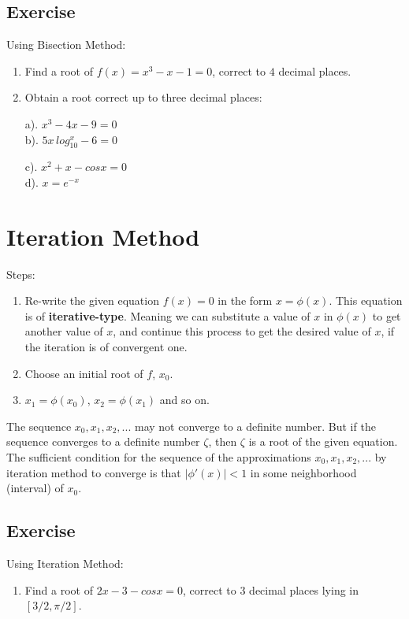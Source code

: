 \documentclass[aima203_lecturenotes_ku.tex]{subfiles}
\begin{document}
\subsection{Exercise}
Using Bisection Method:
\begin{enumerate}
\item Find a root of \(f(x)=x^3-x-1=0\), correct to \(4\) decimal places.
  \item Obtain a root correct up to three decimal places:
  \begin{multicols}{2}
    a). $x^3-4x-9=0$ \\
    b). $5x\, log_{10}^x -6 = 0$

    \columnbreak

    c). $x^2 +x -cosx = 0$ \\
    d). $x=e^{-x}$
  \end{multicols}
\end{enumerate}

\section{Iteration Method}
Steps:
\begin{enumerate}
\item Re-write the given equation \(f(x)=0\) in the form \(x= \phi (x)\).
  This equation is of \textbf{iterative-type}. Meaning we can substitute a value of \(x\) in \(\phi (x)\) to get another value of \(x\), and continue this process to get the desired value of \(x\), if the iteration is of convergent one.
\item Choose an initial root of \(f\), \(x_0\).
\item \(x_1=\phi (x_0)\), \(x_2= \phi(x_1)\) and so on.
\end{enumerate}
The sequence \(x_0, x_1, x_2, ...\) may not converge to a definite number. But if the sequence converges to a definite number \(\zeta\), then \(\zeta\) is a root of the given equation. The sufficient condition for the sequence of the approximations $x_0, x_1, x_2,...$ by iteration method to converge is that $|\phi ' (x) | < 1$ in some neighborhood (interval) of $x_0$.

\subsection{Exercise}
Using Iteration Method:
\begin{enumerate}
\item Find a root of \(2x-3-cosx=0\), correct to \(3\) decimal places lying in $[3/2, \pi/2]$.
\end{enumerate}
\end{document}
